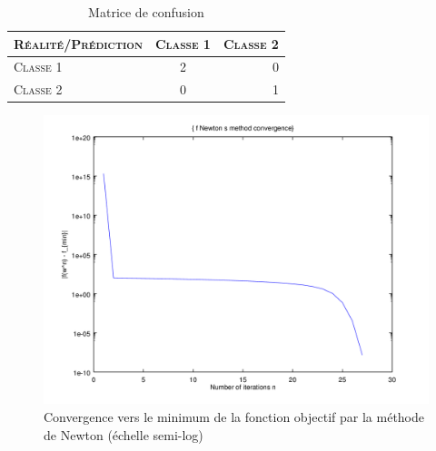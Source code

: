 \documentclass{article}
\begin{document}
     \begin{table}[H]
       \caption{Matrice de confusion}
       \begin{tabular}{|l|c|r|}
         \hline
         \textsc{Réalité/Prédiction} & \textsc{Classe 1} & \textsc{Classe 2}\\
         \hline
         \textsc{Classe 1} & 2 & 0\\
         \hline
         \textsc{Classe 2} & 0 & 1\\
         \hline
       \end{tabular}
     \end{table}

         \begin{figure}
           \begin{center}
             \includegraphics[scale=0.5]{images/cvnewton1.png}
             \caption{Convergence vers le minimum de la fonction objectif par la méthode de Newton (échelle semi-log)}
           \end{center}
         \end{figure}
\end{document}
